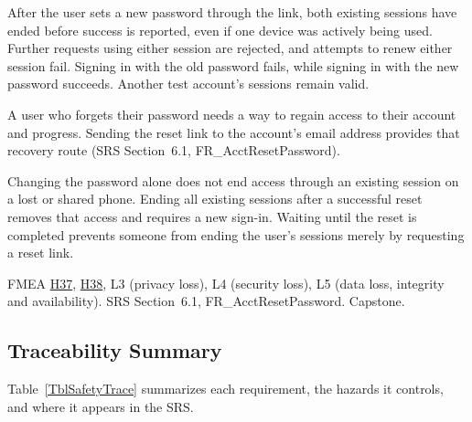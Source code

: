 \documentclass{article}
\newcommand{\hazref}[1]{\hyperref[#1]{#1}}
\begin{document}
\begin{description}
{After the user sets a new password through the link, both existing sessions have ended before success is reported, even if one device was actively being used. Further requests using either session are rejected, and attempts to renew either session fail. Signing in with the old password fails, while signing in with the new password succeeds. Another test account's sessions remain valid.}
{A user who forgets their password needs a way to regain access to their
account and progress. Sending the reset link to the account's email address provides that recovery route (SRS Section~6.1, FR\_AcctResetPassword).

Changing the password alone does not end access through an existing session on a lost or shared phone. Ending all existing sessions after a successful reset removes that access and requires a new sign-in. Waiting until the reset is completed prevents someone from ending the user's sessions merely by requesting a reset link.}
{FMEA \hazref{H37}, \hazref{H38}, L3 (privacy loss), L4 (security loss), L5 (data loss, integrity and availability).}
{SRS Section~6.1, FR\_AcctResetPassword.}
{Capstone.}

\end{description}

\subsection{Traceability Summary}

Table~\ref{TblSafetyTrace} summarizes each requirement, the hazards it
controls, and where it appears in the SRS.
\end{document}

